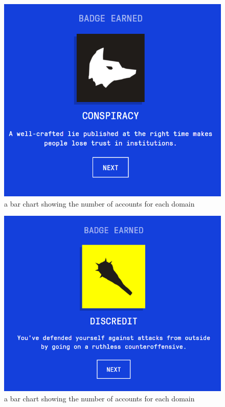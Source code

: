 \documentclass[12pt]{article}
\begin{document}
\begin{figure}[H]
            \centering
            \includegraphics[trim=0 0 0 0, clip, width=\textwidth] {fourthbadge.PNG}
            \caption{ a bar chart showing the number of accounts for each domain}
            \label{fig:4}
\end{figure}
\begin{figure}[H]
            \centering
            \includegraphics[trim=0 0 0 0, clip, width=\textwidth] {fifthBadge.PNG}
            \caption{ a bar chart showing the number of accounts for each domain}
            \label{fig:5}
\end{figure}
\end{document}
